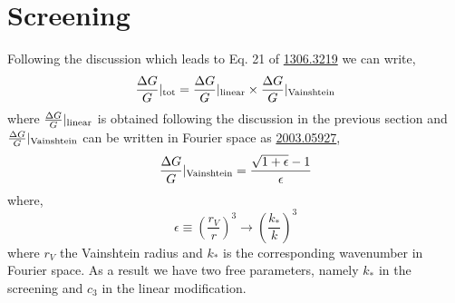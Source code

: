 \documentclass{article}
\def\be{\begin{equation}}
\def\ee{\end{equation}}
\begin{document}
\section{Screening}
Following the discussion which leads to Eq. 21 of \href{https://arxiv.org/abs/1306.3219}{1306.3219} we can write,
\be
\frac{\Delta G}{G}|_{\rm tot} =  \frac{\Delta G}{G}|_{\rm linear}  \times \frac{\Delta G}{G}|_{\rm Vainshtein}
\ee
where $\frac{\Delta G}{G}|_{\rm linear}$  is obtained following the discussion in the previous section and  $\frac{\Delta G}{G}|_{\rm Vainshtein}$ can be written in Fourier space as \href{https://arxiv.org/pdf/2003.05927.pdf}{2003.05927},
\be
\frac{\Delta G}{G}|_{\rm Vainshtein} = \frac{\sqrt{1+ \epsilon}-1}{\epsilon}
\ee
where,
 \be
 \epsilon \equiv (\frac{r_V}{r})^3 \to (\frac{k_*}{k})^3
 \ee
where $r_V$ the Vainshtein radius and $k_*$ is the corresponding wavenumber in Fourier space. As a result we have two free parameters, namely $k_*$ in the screening and $c_3$ in the linear modification.
\end{document}
